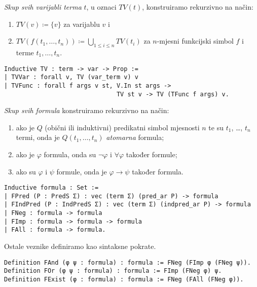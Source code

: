 \pagebreak
\begin{definition}
  \textit{Skup svih varijabli terma} \(t\), u oznaci \(\mathit{TV}(t)\), konstruiramo rekurzivno na način:
  \begin{enumerate}
  \item \( \mathit{TV}(v) \coloneq \{ v \} \) za varijablu \(v\) i
  \item \( \mathit{TV}(f(t_{1}, \ldots, t_{n})) \coloneq \bigcup_{1 \le i \le n} \mathit{TV}(t_{i}) \) za \(n\)-mjesni funkcijski simbol \(f\) i terme \(t_{1}, \ldots, t_{n}\).
  \end{enumerate}
\begin{verbatim}
Inductive TV : term -> var -> Prop :=
| TVVar : forall v, TV (var_term v) v
| TVFunc : forall f args v st, V.In st args ->
                               TV st v -> TV (TFunc f args) v.
\end{verbatim}
\end{definition}

\begin{definition}\label{def:formula}
  \textit{Skup svih formula} konstruiramo rekurzivno na način:
  \begin{enumerate}
  \item ako je \(Q\) (obični ili induktivni) predikatni simbol mjesnosti \(n\) te su \(t_{1}\), \ldots, \(t_{n}\) termi,
    onda je \(Q(t_{1}, \ldots, t_{n})\) \textit{atomarna} formula;
  \item ako je \(\varphi\) formula, onda su \(\neg\varphi\) i \(\forall\varphi\) također formule;
  \item ako su \(\varphi\) i \(\psi\) formule, onda je \(\varphi \rightarrow \psi\) također formula.
  \end{enumerate}
\begin{verbatim}
Inductive formula : Set :=
| FPred (P : PredS Σ) : vec (term Σ) (pred_ar P) -> formula 
| FIndPred (P : IndPredS Σ) : vec (term Σ) (indpred_ar P) -> formula 
| FNeg : formula -> formula 
| FImp : formula -> formula -> formula 
| FAll : formula -> formula.
\end{verbatim}
  \noindent Ostale veznike definiramo kao sintaksne pokrate.
\begin{verbatim}
Definition FAnd (φ ψ : formula) : formula := FNeg (FImp φ (FNeg ψ)).
Definition FOr (φ ψ : formula) : formula := FImp (FNeg φ) ψ.
Definition FExist (φ : formula) : formula := FNeg (FAll (FNeg φ)).
\end{verbatim}
\end{definition}

